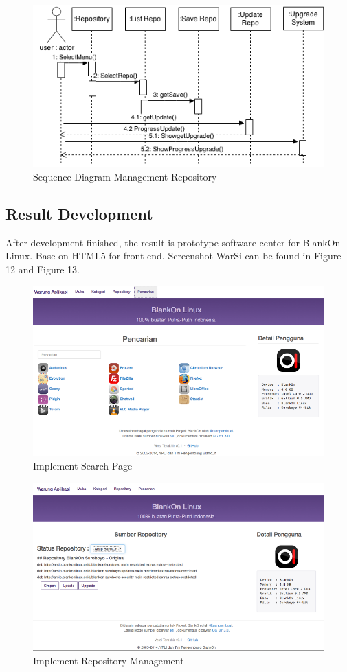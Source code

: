 \documentclass[conference, letterpaper]{IEEEtran}
\begin{document}
\begin{figure}[!t]
\centering
\includegraphics[scale=0.4]{image/ManagementRepo.png}
\caption{Sequence Diagram Management Repository}
\end{figure}

\subsection{Result Development}
After development finished, the result is prototype software center for BlankOn Linux. Base on HTML5 for front-end. Screenshot WarSi can be found in Figure 12 and Figure 13.
\begin{figure}[!t]
\centering
\includegraphics[scale=0.31]{image/03HamalanPencarian.png}
\caption{Implement Search Page}
\end{figure}

\begin{figure}[!t]
\centering
\includegraphics[scale=0.31]{image/02HalamanRepository.png}
\caption{Implement Repository Management}
\end{figure}
\end{document}

